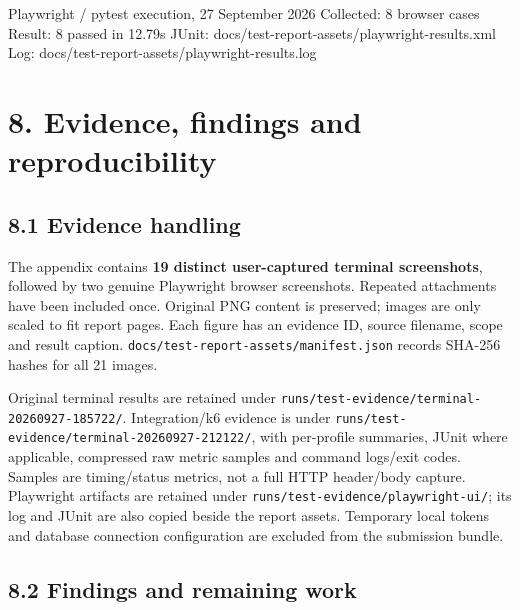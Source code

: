 \documentclass[
  11pt,
]{article}
\newenvironment{Shaded}{}{}
\newcommand{\NormalTok}[1]{#1}
\begin{document}
\begin{Shaded}
\begin{Highlighting}[]
\NormalTok{Playwright / pytest execution, 27 September 2026}
\NormalTok{Collected: 8 browser cases}
\NormalTok{Result:    8 passed in 12.79s}
\NormalTok{JUnit:     docs/test{-}report{-}assets/playwright{-}results.xml}
\NormalTok{Log:       docs/test{-}report{-}assets/playwright{-}results.log}
\end{Highlighting}
\end{Shaded}

\section{8. Evidence, findings and
reproducibility}\label{evidence-findings-and-reproducibility}

\subsection{8.1 Evidence handling}\label{evidence-handling}

The appendix contains \textbf{19 distinct user-captured terminal
screenshots}, followed by two genuine Playwright browser screenshots.
Repeated attachments have been included once. Original PNG content is
preserved; images are only scaled to fit report pages. Each figure has
an evidence ID, source filename, scope and result caption.
\texttt{docs/test-report-assets/manifest.json} records SHA-256 hashes
for all 21 images.

Original terminal results are retained under
\texttt{runs/test-evidence/terminal-20260927-185722/}. Integration/k6
evidence is under \texttt{runs/test-evidence/terminal-20260927-212122/},
with per-profile summaries, JUnit where applicable, compressed raw
metric samples and command logs/exit codes. Samples are timing/status
metrics, not a full HTTP header/body capture. Playwright artifacts are
retained under \texttt{runs/test-evidence/playwright-ui/}; its log and
JUnit are also copied beside the report assets. Temporary local tokens
and database connection configuration are excluded from the submission
bundle.

\subsection{8.2 Findings and remaining
work}\label{findings-and-remaining-work}
\end{document}

